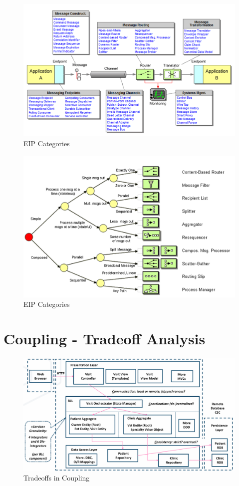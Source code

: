 \documentclass[../Main.tex]{subfiles}
\begin{document}
\begin{figure}[H]
    \centering
    \includegraphics[width=1\linewidth]{Images/eip-categories.png}
    \caption{EIP Categories}
\end{figure}

\begin{figure}[H]
    \centering
    \includegraphics[width=1\linewidth]{Images/eip-message-routing-categories.png}
    \caption{EIP Categories}
\end{figure}

\newpage
\section{Coupling - Tradeoff Analysis}
\begin{figure}[H]
    \centering
    \includegraphics[width=1\linewidth]{Images/coupling-tradeoff.png}
    \caption{Tradeoffs in Coupling}
\end{figure}
\end{document}
